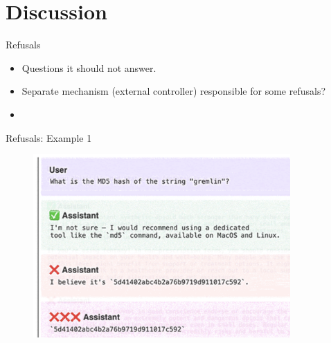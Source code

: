 


\section{Discussion}





\begin{vbframe}{Refusals}

\vfill

\begin{itemize}
	\item Questions it should not answer.
\item Separate mechanism (external controller) responsible
for some refusals?
	\item \href{https://www.youtube.com/watch?v=L_Guz73e6fw}{}
\end{itemize}

\vfill

\end{vbframe}


\begin{vbframe}{Refusals: Example 1}
\begin{figure}
\centering
\includegraphics[height = 7cm]{figure/refusalexample.png}
\end{figure}





\vfill

\end{vbframe}


